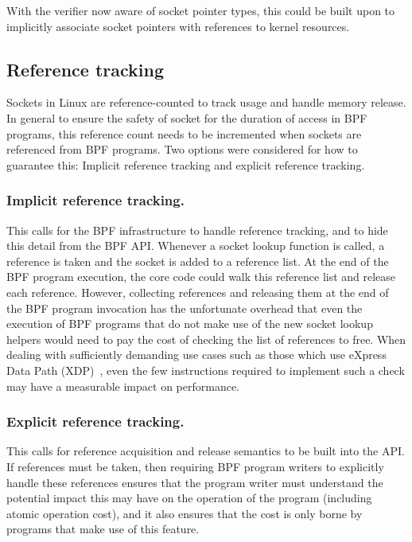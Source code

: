 \documentclass[10pt,sigconf,authorversion]{lpc}
\begin{document}
With the verifier now aware of socket pointer types, this could be built upon
to implicitly associate socket pointers with references to kernel resources.

\subsection{Reference tracking}

Sockets in Linux are reference-counted to track usage and handle memory
release. In general to ensure the safety of socket for the duration of access
in BPF programs, this reference count needs to be incremented when sockets are
referenced from BPF programs. Two options were considered for how to guarantee
this: Implicit reference tracking and explicit reference tracking.


\subsubsection{Implicit reference tracking.}

This calls for the BPF infrastructure to handle reference tracking, and to hide
this detail from the BPF API. Whenever a socket lookup function is called, a
reference is taken and the socket is added to a reference list. At the end of
the BPF program execution, the core code could walk this reference list and
release each reference. However, collecting references and releasing them at
the end of the BPF program invocation has the unfortunate overhead that even
the execution of BPF programs that do not make use of the new socket lookup
helpers would need to pay the cost of checking the list of references to free.
When dealing with sufficiently demanding use cases such as those which use
eXpress Data Path (XDP)~\cite{xdp}, even the few instructions required to
implement such a check may have a measurable impact on performance.

\subsubsection{Explicit reference tracking.}

This calls for reference acquisition and release semantics to be built into the
API. If references must be taken, then requiring BPF program writers to
explicitly handle these references ensures that the program writer must
understand the potential impact this may have on the operation of the program
(including atomic operation cost), and it also ensures that the cost is only
borne by programs that make use of this feature.
\end{document}

